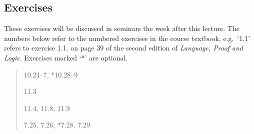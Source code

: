 \documentclass[12pt]{extarticle}
\begin{document}
\begin{multicols*}{3}
\vfill
\begin{minipage}{\columnwidth}
\section{Exercises}
These exercises will be discussed in seminars the week after this lecture.
The numbers below refer to the numbered exercises in the course textbook, e.g.\ `1.1' refers to exercise 1.1. on page 39 of the second edition of \emph{Language, Proof and Logic}. Exercises marked `*' are optional.
 
\begin{quote}
10.24–7, *10.28–9
 
11.3
 
11.4, 11.8, 11.9
 
7.25, 7.26, *7.28, 7.29
 
\end{quote}
\end{minipage}

 


\end{multicols*}
\end{document}
